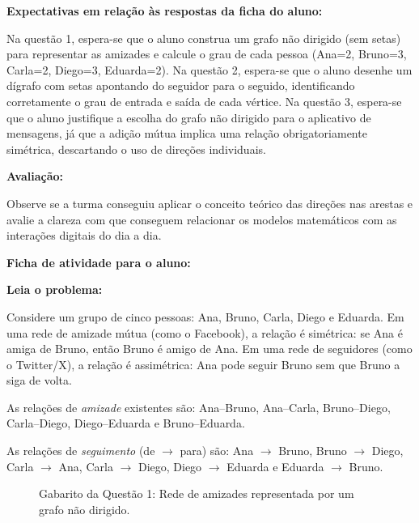 \documentclass[
  12pt,
  oneside,
  a4paper,
  english,
  brazilian
  ]{abntex2}
\theoremstyle{definition}
\def\\{ }%
\def\vspace#1{ }%
\def\bfseries{}%
\begin{document}
\begin{apendicesenv}
\textbf{Expectativas em relação às respostas da ficha do aluno:}

Na questão 1, espera-se que o aluno construa um grafo não dirigido (sem setas) para representar as amizades e calcule o grau de cada pessoa (Ana=2, Bruno=3, Carla=2, Diego=3, Eduarda=2). Na questão 2, espera-se que o aluno desenhe um dígrafo com setas apontando do seguidor para o seguido, identificando corretamente o grau de entrada e saída de cada vértice. Na questão 3, espera-se que o aluno justifique a escolha do grafo não dirigido para o aplicativo de mensagens, já que a adição mútua implica uma relação obrigatoriamente simétrica, descartando o uso de direções individuais.
\\
\textbf{Avaliação:}

Observe se a turma conseguiu aplicar o conceito teórico das direções nas arestas e avalie a clareza com que conseguem relacionar os modelos matemáticos com as interações digitais do dia a dia.

\newpage
\begin{center}
\textbf{Ficha de atividade para o aluno:}
\end{center}

\textbf{Leia o problema:}

Considere um grupo de cinco pessoas: Ana, Bruno, Carla, Diego e Eduarda. Em uma rede de amizade mútua (como o Facebook), a relação é simétrica: se Ana é amiga de Bruno, então Bruno é amigo de Ana. Em uma rede de seguidores (como o Twitter/X), a relação é assimétrica: Ana pode seguir Bruno sem que Bruno a siga de volta.

As relações de \emph{amizade} existentes são:
Ana--Bruno, Ana--Carla, Bruno--Diego, Carla--Diego, Diego--Eduarda e Bruno--Eduarda.

As relações de \emph{seguimento} (de $\to$ para) são:
Ana $\to$ Bruno, Bruno $\to$ Diego, Carla $\to$ Ana, Carla $\to$ Diego, Diego $\to$ Eduarda e Eduarda $\to$ Bruno.

\begin{figure}[htbp]
    \centering
    \caption{Gabarito da Questão 1: Rede de amizades representada por um grafo não dirigido.}
    \label{fig:rede_amizades}
\end{figure}
\vspace{0.5cm}


\end{apendicesenv}
\end{document}
